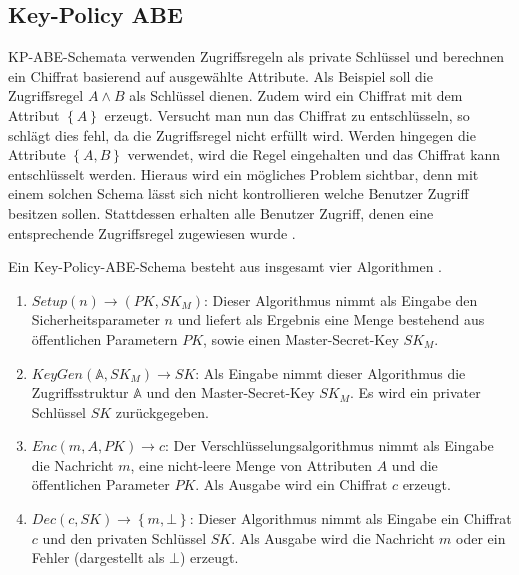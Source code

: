 \documentclass{hsflensburg}
\begin{document}
	\subsection{Key-Policy ABE}
	KP-ABE-Schemata verwenden Zugriffsregeln als private Schlüs\-sel und berechnen
	ein Chiffrat basierend auf ausgewählte Attribute. Als Beispiel soll die
	Zugriffsregel $A \land B$ als Schlüssel dienen. Zudem wird ein Chiffrat mit
	dem Attribut $\left\{A\right\}$ erzeugt. Versucht man nun das Chiffrat zu entschlüsseln,
	so schlägt dies fehl, da die Zugriffsregel nicht erfüllt wird. Werden hingegen
	die Attribute $\left\{A, B\right\}$ verwendet, wird die Regel eingehalten und
	das Chiffrat kann entschlüsselt werden. Hieraus wird ein mögliches Problem
	sichtbar, denn mit einem solchen Schema lässt sich nicht kontrollieren welche
	Benutzer Zugriff besitzen sollen. Stattdessen erhalten alle Benutzer Zugriff,
	denen eine entsprechende Zugriffsregel zugewiesen wurde \cite{cp-abe-ieee}.

	Ein Key-Policy-ABE-Schema besteht aus insgesamt vier Algorithmen \cite{kp-abe}.

	\begin{enumerate}
		\item $\textit{Setup}\left(n\right) \to \left(PK, SK_M\right)$: Dieser
			Algorithmus nimmt als Eingabe den Sicherheitsparameter $n$ und liefert als
			Ergebnis eine Menge bestehend aus öffentlichen Parametern $PK$, sowie
			einen Master-Secret-Key $SK_M$.
		\item $\textit{KeyGen}\left(\mathbb{A}, SK_M\right) \to SK$: Als Eingabe
			nimmt dieser Algorithmus die Zu\-griffs\-struktur $\mathbb{A}$ und den
			Master-Secret-Key $SK_M$. Es wird ein privater Schlüssel $SK$
			zurückgegeben.
		\item $Enc\left(m, A, PK\right) \to c$: Der Verschlüsselungsalgorithmus
			nimmt als Eingabe die Nachricht $m$, eine nicht-leere Menge von Attributen
			$A$ und die öffentlichen Parameter $PK$. Als Ausgabe wird ein Chiffrat $c$
			erzeugt.
		\item $Dec\left(c, SK\right) \to \left\{m, \bot\right\}$: Dieser Algorithmus
			nimmt als Eingabe ein Chiffrat $c$ und den privaten Schlüssel $SK$. Als
			Ausgabe wird die Nachricht $m$ oder ein Fehler (dargestellt als $\bot$)
			erzeugt.
	\end{enumerate}
\end{document}
